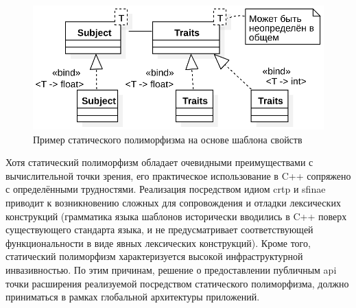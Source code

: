 \begin{figure}
    \centering
    \includegraphics[width=0.7\linewidth]{images/illustrative/static-polymorphism-example.eps}
    \caption{Пример статического полиморфизма на основе шаблона свойств}
    \label{fig:cpp-static-polymorphism-example}
\end{figure}

Хотя статический полиморфизм обладает очевидными преимуществами
с вычислительной точки зрения, его практическое использование в C++
сопряжено с определёнными трудностями. Реализация посредством идиом
\acrshort{crtp} и \acrshort{sfinae} приводит к возникновению сложных для сопровождения
и отладки лексических конструкций (грамматика
языка шаблонов исторически вводились в C++ поверх существующего
стандарта языка, и не предусматривает соответствующей
функциональности в виде явных лексических конструкций).
Кроме того, статический полиморфизм характеризуется высокой
инфраструктурной инвазивностью.
По этим причинам,
решение о предоставлении публичным \acrshort{api} точки расширения
реализуемой посредством статического полиморфизма, должно приниматься
в рамках глобальной архитектуры приложений.



